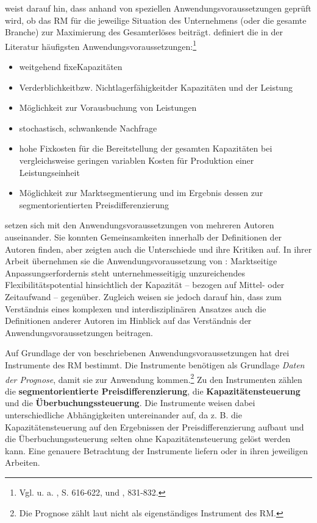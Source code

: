 \cite{Petrick:2009aa} weist da\-rauf hin, dass anhand von speziellen Anwendungsvoraussetzungen geprüft wird, ob das RM für die jeweilige Situation des Unternehmens (oder die gesamte Branche) zur Maximierung des Gesamterlöses beiträgt. \cite{kimes1989yield} definiert die in der Literatur häufigsten Anwendungsvoraussetzungen:\footnote{Vgl. u. a. \cite{friege1996yield}, S. 616-622, und \cite{weatherford1992taxonomy}, 831-832.}
\begin{itemize}
	\item \glqq weitgehend fixe\grqq\;Kapazitäten
	\item \glqq Verderblichkeit\grqq\;bzw. \glqq Nichtlagerfähigkeit\grqq\;der Kapazitäten und der Leistung
	\item Möglichkeit zur Vorausbuchung von Leistungen
	\item stochastisch, schwankende Nachfrage
	\item hohe Fixkosten für die Bereitstellung der gesamten Kapazitäten bei vergleichsweise geringen variablen Kosten für Produktion einer Leistungseinheit
	\item Möglichkeit zur Marktsegmentierung und im Ergebnis dessen zur segmentorientierten Preisdifferenzierung
\end{itemize}
\vspace{0.2cm}

\cite{Klein:2008aa} setzen sich mit den Anwendungsvoraussetzungen von mehreren Autoren auseinander. Sie konnten Gemeinsamkeiten innerhalb der Definitionen der Autoren finden, aber zeigten auch die Unterschiede und ihre Kritiken auf. In ihrer Arbeit übernehmen sie die Anwendungsvoraussetzung von \cite{corsten1998yield}: \glqq Marktseitige Anpassungserfordernis steht unternehmesseitigig unzureichendes Flexibilitätspotential hinsichtlich der Kapazität -- bezogen auf Mittel- oder Zeitaufwand -- gegenüber\grqq. Zugleich weisen sie jedoch darauf hin, dass zum Verständnis eines komplexen und interdisziplinären Ansatzes auch die Definitionen anderer Autoren im Hinblick auf das Verständnis der Anwendungsvoraussetzungen beitragen.

Auf Grundlage der von \cite{friege1996yield} beschriebenen Anwendungsvoraussetzungen hat \cite{Petrick:2009aa} drei Instrumente des RM bestimmt. Die Instrumente benötigen als Grundlage \textit{Daten der Prognose}, damit sie zur Anwendung kommen.\footnote{Die Prognose zählt laut \cite{Petrick:2009aa} nicht als eigenständiges Instrument des RM.} Zu den Instrumenten zählen die \textbf{segmentorientierte Preisdifferenzierung}, die \textbf{Kapazitäten\-steuerung} und die \textbf{Über\-buchungssteuerung}. Die Instrumente weisen dabei unterschiedliche Ab\-hängigkeit\-en untereinander auf, da z. B. die Kapazitä\-tensteu\-erung auf den Ergebnissen der Preisdifferenzierung aufbaut und die Überbuchungssteuerung selten ohne Kapazitätensteuerung gelöst werden kann. Eine genauere Betrachtung der Instrumente liefern \cite{talluri2004theory} oder \cite{Petrick:2009aa} in ihren jeweiligen Arbeiten.

